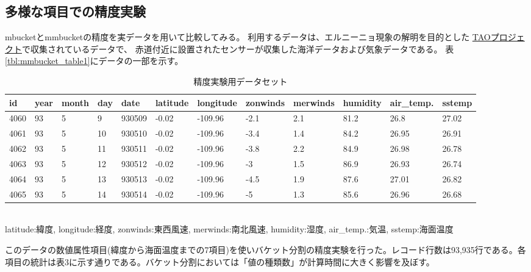 \subsection*{多様な項目での精度実験}

mbucketとmmbucketの精度を実データを用いて比較してみる。
利用するデータは、エルニーニョ現象の解明を目的とした
\href{http://www.pmel.noaa.gov/tao/}{TAOプロジェクト}で収集されているデータで、
赤道付近に設置されたセンサーが収集した海洋データおよび気象データである。
表\ref{tbl:mmbucket_table1}にデータの一部を示す。\\

\begin{table}[hbt]
\begin{center}
\caption{精度実験用データセット\label{tbl:mmbucket_table0}}
{\footnotesize
\begin{tabular}{l|l|l|l|l|l|l|l|l|l|l|l}\hline
id & year & month & day & date & latitude & longitude & zonwinds & merwinds & humidity & air\_temp. &sstemp \\ \hline
4060 & 93 &5 & 9 & 930509 & -0.02 & -109.96 & -2.1 & 2.1 & 81.2 & 26.8 & 27.02\\
4061 & 93 & 5 & 10 & 930510 & -0.02 & -109.96 & -3.4 & 1.4 & 84.2 & 26.95 & 26.91\\
4062 & 93 & 5 & 11 & 930511 & -0.02 & -109.96 & -3.8 & 2.2 & 84.9 & 26.98 & 26.78\\
4063 & 93 & 5 & 12 & 930512 & -0.02 & -109.96 & -3 & 1.5 & 86.9 & 26.93 & 26.74\\
4064 & 93 & 5 & 13 & 930513 & -0.02 & -109.96 & -4.5 & 1.9 & 87.6 & 27.01 & 26.82\\
4065 & 93 & 5 & 14 & 930514 & -0.02 & -109.96 & -5    & 1.3 & 85.6 & 26.96 & 26.68\\
\hline
\end{tabular}
\\
latitude:緯度, longitude:経度, zonwinds:東西風速, merwinds:南北風速, humidity:湿度, air\_temp.:気温, sstemp:海面温度
}
\end{center}
\end{table}

このデータの数値属性項目(緯度から海面温度までの7項目)を使いバケット分割の精度実験を行った。レコード行数は93,935行である。各項目の統計は表3に示す通りである。バケット分割においては「値の種類数」が計算時間に大きく影響を及ぼす。

